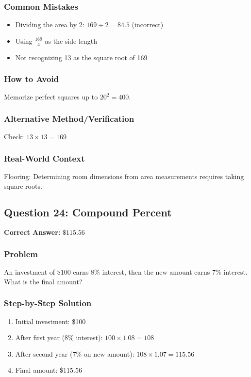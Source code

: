 \documentclass[12pt,a4paper]{article}
\begin{document}
\subsubsection*{Common Mistakes}
\begin{itemize}
    \item Dividing the area by 2: $169 \div 2 = 84.5$ (incorrect)
    \item Using $\frac{169}{4}$ as the side length
    \item Not recognizing 13 as the square root of 169
\end{itemize}

\subsubsection*{How to Avoid}
Memorize perfect squares up to $20^2 = 400$.

\subsubsection*{Alternative Method/Verification}
Check: $13 \times 13 = 169$ 

\subsubsection*{Real-World Context}
Flooring: Determining room dimensions from area measurements requires taking square roots.

\vspace{0.5cm}

\subsection*{Question 24: Compound Percent}

\textbf{Correct Answer:} $\$115.56$

\subsubsection*{Problem}
An investment of \$100 earns 8\% interest, then the new amount earns 7\% interest. What is the final amount?

\subsubsection*{Step-by-Step Solution}
\begin{enumerate}
    \item Initial investment: \$100
    \item After first year (8\% interest): $100 \times 1.08 = 108$
    \item After second year (7\% on new amount): $108 \times 1.07 = 115.56$
    \item Final amount: \$115.56
\end{enumerate}
\end{document}
